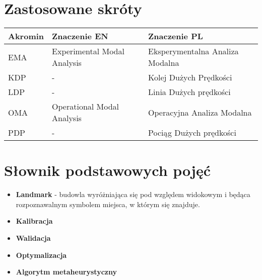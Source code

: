 \chapter*{Zastosowane skróty}
%
\makeatletter
\setlength{\@fptop}{0pt}
\makeatother


\begin{table}[h]
	\footnotesize
	\setlength\extrarowheight{5pt}
	\begin{tabular}{P{0.1\textwidth} P{0.4\textwidth} P{0.4\textwidth}}
		\toprule
		\textbf{Akromin} & \textbf{Znaczenie EN} & \textbf{Znaczenie PL} 					\\ \midrule
		EMA     & Experimental Modal Analysis         & Eksperymentalna Analiza Modalna         \\ 
		KDP		& -									&Kolej Dużych Prędkości 				\\ 
		LDP		& -									&Linia Dużych prędkości 		\\ 
		OMA     & Operational Modal Analysis         & Operacyjna Analiza Modalna   \\ 
		PDP		& -									&Pociąg Dużych prędkości 		\\ 
	\end{tabular}
\end{table}


\chapter*{Słownik podstawowych pojęć}
\begin{itemize}[label = {},leftmargin=*]
\item \textbf{Landmark} - budowla wyróżniająca się pod względem widokowym i będąca rozpoznawalnym symbolem miejsca, w którym się znajduje.
\item \textbf{Kalibracja}
\item \textbf{Walidacja}
\item \textbf{Optymalizacja}
\item \textbf{Algorytm metaheurystyczny}
\end{itemize}
